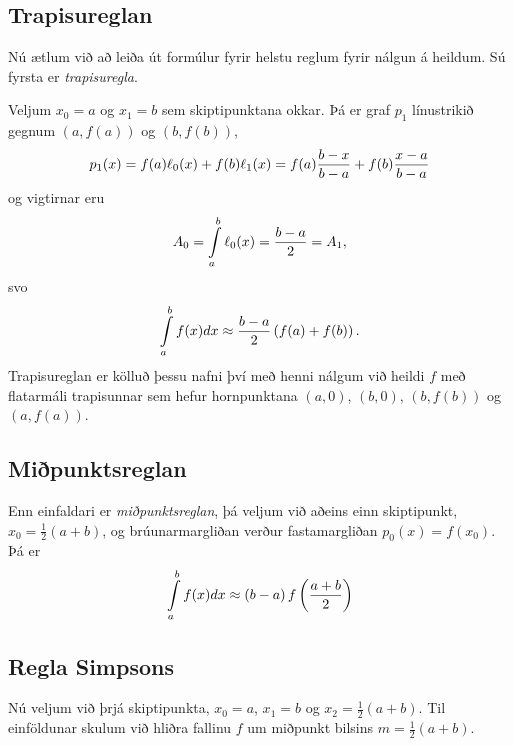 \documentclass[letterpaper,10pt,icelandic]{sphinxmanual}
\begin{document}

\subsection{Trapisureglan}
\label{kafli05:trapisureglan}\label{kafli05:index-2}
Nú ætlum við að leiða út formúlur fyrir helstu reglum fyrir nálgun á
heildum. Sú fyrsta er \emph{trapisuregla}.

Veljum \(x_0 = a\) og \(x_1 = b\) sem skiptipunktana okkar. Þá
er graf \(p_1\) línustrikið gegnum \((a,f(a))\) og
\((b,f(b))\),
\begin{gather}
\begin{split}p_1(x) = f(a) \ell_0(x) + f(b) \ell_1(x)
  = f(a)\frac{b-x}{b-a} + f(b) \frac{x-a}{b-a}\end{split}\notag
\end{gather}
og vigtirnar eru
\begin{gather}
\begin{split}A_0 = \int\limits_a^b \ell_0(x) = \frac{b-a}{2} = A_1,\end{split}\notag
\end{gather}
svo
\begin{gather}
\begin{split}\int\limits_a^b f(x) dx \approx
  \frac{b-a}{2}\left(f(a)+f(b)\right).\end{split}\notag
\end{gather}
Trapisureglan er kölluð þessu nafni því með henni nálgum við heildi
\(f\) með flatarmáli trapisunnar sem hefur hornpunktana
\((a,0)\), \((b,0)\), \((b,f(b))\) og \((a,f(a))\).


\subsection{Miðpunktsreglan}
\label{kafli05:index-3}\label{kafli05:mipunktsreglan}
Enn einfaldari er \emph{miðpunktsreglan}, þá veljum við aðeins einn
skiptipunkt, \(x_0 = \frac{1}{2}(a+b)\), og brúunarmargliðan verður
fastamargliðan \(p_0(x) = f(x_0)\). Þá er
\begin{gather}
\begin{split}\int\limits_a^b f(x) dx \approx (b-a)\, f\left(\frac{a+b}{2}\right)\end{split}\notag
\end{gather}

\subsection{Regla Simpsons}
\label{kafli05:index-4}\label{kafli05:regla-simpsons}
Nú veljum við þrjá skiptipunkta, \(x_0 = a\), \(x_1 = b\) og
\(x_2 =
\frac{1}{2}(a+b)\). Til einföldunar skulum við hliðra fallinu \(f\)
um miðpunkt bilsins \(m=\tfrac{1}{2}(a+b)\).
\end{document}
